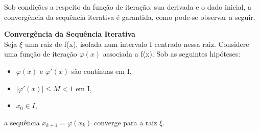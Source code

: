 Sob condições a respeito da função de iteração, sua derivada e o dado inicial,
a convergência da sequência iterativa é garantida, como pode-se observar a
seguir.
\begin{teo} \textbf{Convergência da Sequência Iterativa} \label{teoMPF}\\
    Seja $\xi$ uma raiz de f(x), isolada num intervalo I centrado nessa raiz. Considere uma função de iteração $\varphi(x)$ associada a f(x). Sob as seguintes hipóteses:
    \begin{itemize}
        \item[i)] $\varphi(x)$ e $\varphi'(x)$ são contínuas em I,
        \item [ii)] $|\varphi'(x)| \leq M < 1$ em I,
        \item [iii)] $x_0 \in I$,
    \end{itemize}
    a sequência $x_{k+1} = \varphi(x_k)$ converge para a raiz $\xi$.
\end{teo}
